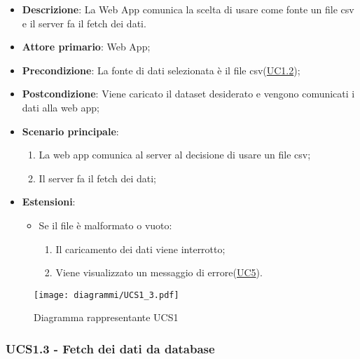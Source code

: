\begin{itemize}

	\item \textbf{Descrizione}: La Web App comunica la scelta di usare come fonte un file csv e il server fa il fetch dei dati.
	
    \item \textbf{Attore primario}: Web App;
	        
    \item \textbf{Precondizione}:   La fonte di dati selezionata è il file csv(\hyperref[ssub:uc1.2]{UC1.2});

    \item \textbf{Postcondizione}:  Viene caricato il dataset desiderato  e vengono comunicati i dati alla web app;

	\item \textbf{Scenario principale}:
		\begin{enumerate}
			\item La web app comunica al server al decisione di usare un file csv;
            \item Il server fa il fetch dei dati;
        \end{enumerate}
		
	\item \textbf{Estensioni}:
		\begin{itemize}
		
			\item Se il file è malformato o vuoto:
			\begin{enumerate}
				
				\item Il caricamento dei dati viene interrotto;
				\item Viene visualizzato un messaggio di errore(\hyperref[sub:uc5]{UC5}).
				
			\end{enumerate}
		
		\end{itemize}
	
\end{itemize}

\begin{figure}[h]
    \centering
    \texttt{[image: diagrammi/UCS1\_3.pdf]}
    \caption{Diagramma rappresentante UCS1}
    \label{fig:UCS1_3}
\end{figure}

\subsubsection{UCS1.3 - Fetch dei dati da database}
\label{ssub:ucs1.3}

